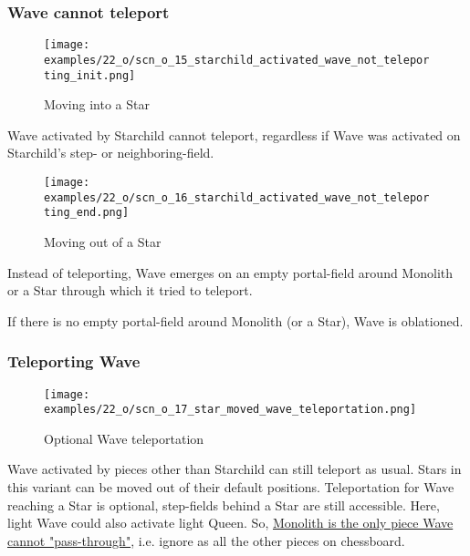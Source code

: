 \subsubsection*{Wave cannot teleport}

\noindent
\begin{wrapfigure}[4]{l}{0.4\textwidth}
\centering
\texttt{[image: examples/22\_o/scn\_o\_15\_starchild\_activated\_wave\_not\_teleporting\_init.png]}
\caption{Moving into a Star}
\label{fig:scn_o_15_starchild_activated_wave_not_teleporting_init}
\end{wrapfigure}
Wave activated by Starchild cannot teleport, regardless if Wave was activated on
Starchild's step- or neighboring-field.

\vspace*{7.1\baselineskip}
\noindent
\begin{wrapfigure}[7]{l}{0.4\textwidth}
\centering
\texttt{[image: examples/22\_o/scn\_o\_16\_starchild\_activated\_wave\_not\_teleporting\_end.png]}
\caption{Moving out of a Star}
\label{fig:scn_o_16_starchild_activated_wave_not_teleporting_end}
\end{wrapfigure}
Instead of teleporting, Wave emerges on an empty portal-field around Monolith or a
Star through which it tried to teleport.

If there is no empty portal-field around Monolith (or a Star), Wave is oblationed.

\clearpage %

\subsubsection*{Teleporting Wave}

\vspace*{-0.9\baselineskip}
\noindent
\begin{figure}[!h]
\texttt{[image: examples/22\_o/scn\_o\_17\_star\_moved\_wave\_teleportation.png]}
\caption{Optional Wave teleportation}
\label{fig:scn_o_17_star_moved_wave_teleportation}
\end{figure}

\vspace*{-0.3\baselineskip}
Wave activated by pieces other than Starchild can still teleport as usual. Stars
in this variant can be moved out of their default positions. Teleportation for
Wave reaching a Star is optional, step-fields behind a Star are still accessible.
Here, light Wave could also activate light Queen. So,
\hyperref[fig:scn_d_10_teleport_wave_via_monolith]{Monolith is the only piece Wave cannot "pass-through"},
i.e. ignore as all the other pieces on chessboard.

